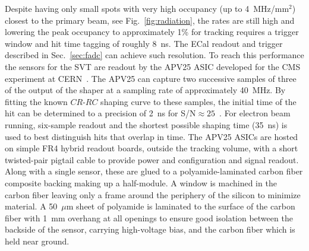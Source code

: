 \documentclass[final,3p,times,twocolumn]{elsarticle}
\begin{document}
Despite having only small spots with very high occupancy (up to 4~MHz/mm$^2$) closest to the primary 
beam, see Fig.~\ref{fig:radiation}, the rates are still high and lowering the peak occupancy to 
approximately 1\% for tracking requires a trigger window and hit time tagging of roughly 8~ns. The 
ECal readout and trigger described in Sec.~\ref{sec:fadc} can achieve such resolution. To reach this 
performance the sensors for the SVT are readout by the APV25 ASIC developed for the CMS 
experiment at CERN~\cite{French:2001xb}. The APV25 can capture two successive samples of three 
of the output of the shaper at a sampling rate of approximately 40~MHz.  By fitting the known 
$CR$-$RC$ shaping curve to these samples, the initial time of the hit can be determined to a precision 
of 2~ns for S/N$\approx25$~\cite{Friedl:2009zz}.  For electron beam running, six-sample readout and 
the shortest possible shaping time (35~ns) is used to best distinguish hits that overlap in time.
The APV25 ASICs are hosted on simple FR4 hybrid readout boards, outside the tracking volume, with a 
short twisted-pair pigtail cable to provide power and configuration and signal readout. Along with a 
single sensor, these are glued to a polyamide-laminated carbon fiber composite backing making 
up a half-module. A window is machined in the carbon fiber leaving only a frame around the periphery 
of the silicon to minimize material. A 50~$\mu$m sheet of polyamide is laminated to the surface of the 
carbon fiber with 1~mm overhang at all openings to ensure good isolation between the backside of the 
sensor, carrying high-voltage bias, and the carbon fiber which is held near ground. 
\end{document}
